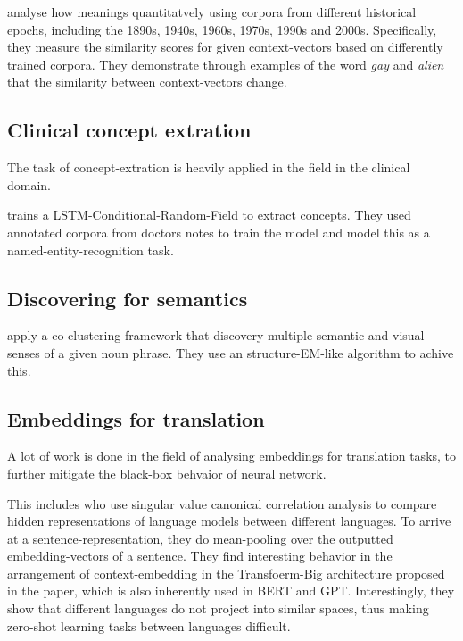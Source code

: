 \documentclass[a4paper,12pt,twoside,openright]{report}
\begin{document}
\cite{hu19} analyse how meanings quantitatvely using corpora from different historical epochs, including the 1890s, 1940s, 1960s, 1970s, 1990s and 2000s. 
Specifically, they measure the similarity scores for given context-vectors based on differently trained corpora.
They demonstrate through examples of the word \textit{gay} and \textit{alien} that the similarity between context-vectors change.

\subsection{Clinical concept extration}

The task of concept-extration is heavily applied in the field in the clinical domain.

\cite{zhu18} trains a LSTM-Conditional-Random-Field to extract concepts.
They used annotated corpora from doctors notes to train the model and model this as a named-entity-recognition task.


\subsection{Discovering for semantics}


\cite{chen19} apply a co-clustering framework that discovery multiple semantic and visual senses of a given noun phrase.
They use an structure-EM-like algorithm to achive this.

\subsection{Embeddings for translation}

A lot of work is done in the field of analysing embeddings for translation tasks, to further mitigate the black-box behvaior of neural network.

This includes \cite{kudugunta18} who use singular value canonical correlation analysis to compare hidden representations of language models between different languages.
To arrive at a sentence-representation, they do mean-pooling over the outputted embedding-vectors of a sentence. 
They find interesting behavior in the arrangement of context-embedding in the Transfoerm-Big architecture proposed in the \cite{vaswani17} paper, which is also inherently used in BERT and GPT.
Interestingly, they show that different languages do not project into similar spaces, thus making zero-shot learning tasks between languages difficult.
\end{document}
